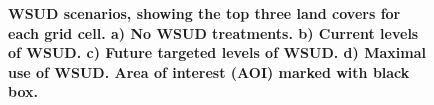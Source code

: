 \documentclass[final,3p,times,authoryear]{elsarticle}
\begin{document}
\begin{figure}[!htbp]
\caption{\bf WSUD scenarios, showing the top three land covers for each grid cell. a) No WSUD treatments. b) Current levels of WSUD. c) Future targeted levels of WSUD. d) Maximal use of WSUD. Area of interest (AOI) marked with black box. }    
 \label{fig:sunburyScenarios} 
\end{figure} 
\end{document}
